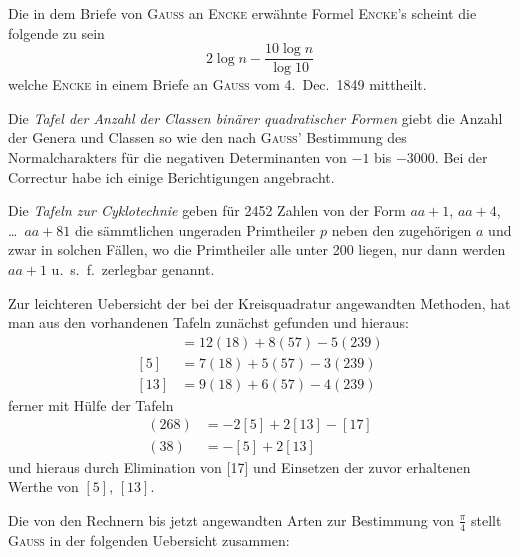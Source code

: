 \documentclass[10pt,a4paper]{article}
\begin{document}
\medskip

Die in dem Briefe von \textsc{Gau\ss} an \textsc{Encke} erw\"ahnte Formel \textsc{Encke}'s scheint die folgende zu sein
\[
2\log n - \frac{10\log n}{\log 10}
\]
welche \textsc{Encke} in einem Briefe an \textsc{Gau\ss} vom 4.~Dec.~1849 mittheilt.

\medskip

Die \textit{Tafel der Anzahl der Classen bin\"arer quadratischer Formen} giebt die Anzahl der Genera und Classen so wie den nach \textsc{Gauss}' Bestimmung des Normalcharakters f\"ur die negativen Determinanten von $-1$ bis $-3000$. Bei der Correctur habe ich einige Berichtigungen angebracht.

\medskip

Die \textit{Tafeln zur Cyklotechnie} geben f\"ur 2452 Zahlen von der Form $aa+1$, $aa+4$, \ldots\ $aa+81$ die s\"ammtlichen ungeraden Primtheiler $p$ neben den zugeh\"origen $a$ und zwar in solchen F\"allen, wo die Primtheiler alle unter 200 liegen, nur dann werden $aa+1$ u.~s.~f.\ zerlegbar genannt.

\medskip

Zur leichteren Uebersicht der bei der Kreisquadratur angewandten Methoden, hat man aus den vorhandenen Tafeln zun\"achst gefunden und hieraus:
\begin{align*}
[2] &= 12(18) + 8(57) - 5(239) \\
[5] &= 7(18) + 5(57) - 3(239) \\
[13] &= 9(18) + 6(57) - 4(239)
\end{align*}
ferner mit H\"ulfe der Tafeln
\begin{align*}
(268) &= -2[5] + 2[13] - [17] \\
(38) &= -[5] + 2[13]
\end{align*}
und hieraus durch Elimination von [17] und Einsetzen der zuvor erhaltenen Werthe von $[5]$, $[13]$.

\medskip

Die von den Rechnern bis jetzt angewandten Arten zur Bestimmung von $\frac{\pi}{4}$ stellt \textsc{Gau\ss} in der folgenden Uebersicht zusammen:
\end{document}
